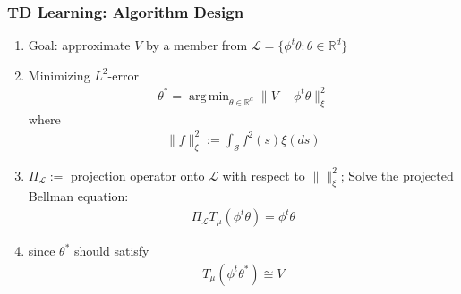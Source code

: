 \documentclass[t,10pt]{beamer}
\newcommand{\R}{\mathbb{R}}
\DeclareMathOperator*{\argmin}{arg\,min}
\theoremstyle{remark}
\begin{document}







\begin{frame}

\frametitle{TD Learning: Algorithm Design}
\begin{enumerate}
\item Goal: approximate $V$ by a member from $\mathcal{L} = \{ \phi^t \theta: \theta \in \R^d\}$ 
\item Minimizing $L^2$-error
\begin{align}
\theta^*  = \argmin_{\theta \in \R^d} \|V- \phi^t \theta \|^2_\xi
\end{align}
where
\begin{align}
\|f \|^2_\xi:= \int_{\mathcal{S}} f^2(s) \xi(ds)
\end{align}
\item $\Pi_{\mathcal{L}}:=$ projection operator onto $\mathcal{L}$ with respect to $\| \|^2_\xi$; Solve the projected Bellman equation:
\begin{align} \label{pbellman}
\Pi_{\mathcal{L}} T_\mu(\phi^t \theta)  = \phi^t \theta
\end{align}
\item since $\theta^*$ should satisfy
\begin{align}
T_\mu(\phi^t \theta^*) \cong V
\end{align}
\end{enumerate}
\end{frame}

\end{document}
